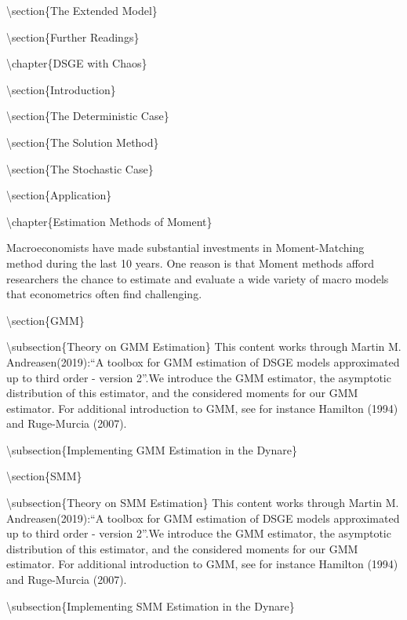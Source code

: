 \documentclass[10pt,math=newtx,citestyle=gb7714-2015,bibstyle=gb7714-2015]{elegantbook}
\begin{document}
	
	\textbackslash{}section\{The Extended Model\}
	
	
	
	
	
	\textbackslash{}section\{Further Readings\}
	
	
	
	
	\textbackslash{}chapter\{DSGE with Chaos\}	
	
	\textbackslash{}section\{Introduction\}
	
	\textbackslash{}section\{The Deterministic Case\}
	
	
	\textbackslash{}section\{The Solution Method\}
	
	
	
	\textbackslash{}section\{The Stochastic Case\}
	
	
	\textbackslash{}section\{Application\}
	
	
	
	
	
	\textbackslash{}chapter\{Estimation Methods of Moment\}
	
	Macroeconomists have made substantial investments in Moment-Matching method during the last 10 years. One reason is that Moment methods afford researchers the chance to estimate and evaluate a wide variety of macro models that econometrics often find challenging.
	
	\textbackslash{}section\{GMM\}
	
	\textbackslash{}subsection\{Theory on GMM Estimation\}
	This content works through Martin M. Andreasen(2019):``A toolbox for GMM estimation of DSGE models approximated up to third order - version 2''.We introduce the GMM estimator, the asymptotic distribution of this estimator, and the considered moments for our GMM estimator. For additional introduction to GMM, see for instance Hamilton (1994) and Ruge-Murcia (2007).
	
	\textbackslash{}subsection\{Implementing GMM Estimation in the Dynare\}
	
	
	\textbackslash{}section\{SMM\}
	
	\textbackslash{}subsection\{Theory on SMM Estimation\}
	This content works through Martin M. Andreasen(2019):``A toolbox for GMM estimation of DSGE models approximated up to third order - version 2''.We introduce the GMM estimator, the asymptotic distribution of this estimator, and the considered moments for our GMM estimator. For additional introduction to GMM, see for instance Hamilton (1994) and Ruge-Murcia (2007).
	
	\textbackslash{}subsection\{Implementing SMM Estimation in the Dynare\}
	
\end{document}
